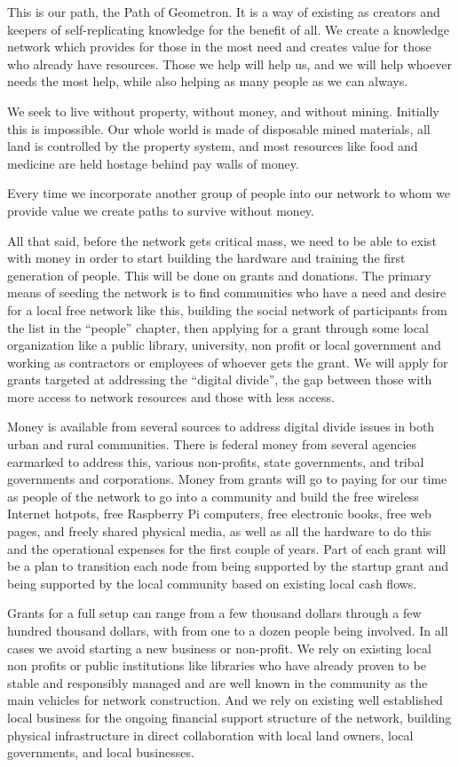 This is our path, the Path of Geometron. It is a way of existing as
creators and keepers of self-replicating knowledge for the benefit of
all. We create a knowledge network which provides for those in the most
need and creates value for those who already have resources. Those we
help will help us, and we will help whoever needs the most help, while
also helping as many people as we can always.

We seek to live without property, without money, and without mining.
Initially this is impossible. Our whole world is made of disposable
mined materials, all land is controlled by the property system, and most
resources like food and medicine are held hostage behind pay walls of
money.

Every time we incorporate another group of people into our network to
whom we provide value we create paths to survive without money.

All that said, before the network gets critical mass, we need to be able
to exist with money in order to start building the hardware and training
the first generation of people. This will be done on grants and
donations. The primary means of seeding the network is to find
communities who have a need and desire for a local free network like
this, building the social network of participants from the list in the
``people'' chapter, then applying for a grant through some local
organization like a public library, university, non profit or local
government and working as contractors or employees of whoever gets the
grant. We will apply for grants targeted at addressing the ``digital
divide'', the gap between those with more access to network resources
and those with less access.

Money is available from several sources to address digital divide issues
in both urban and rural communities. There is federal money from several
agencies earmarked to address this, various non-profits, state
governments, and tribal governments and corporations. Money from grants
will go to paying for our time as people of the network to go into a
community and build the free wireless Internet hotpots, free Raspberry
Pi computers, free electronic books, free web pages, and freely shared
physical media, as well as all the hardware to do this and the
operational expenses for the first couple of years. Part of each grant
will be a plan to transition each node from being supported by the
startup grant and being supported by the local community based on
existing local cash flows.

Grants for a full setup can range from a few thousand dollars through a
few hundred thousand dollars, with from one to a dozen people being
involved. In all cases we avoid starting a new business or non-profit.
We rely on existing local non profits or public institutions like
libraries who have already proven to be stable and responsibly managed
and are well known in the community as the main vehicles for network
construction. And we rely on existing well established local business
for the ongoing financial support structure of the network, building
physical infrastructure in direct collaboration with local land owners,
local governments, and local businesses.

